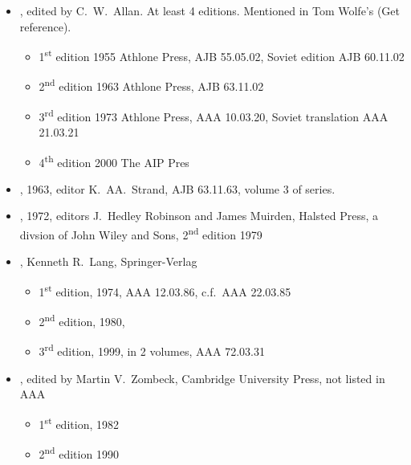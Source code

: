 \documentclass{article}
\begin{document}
\begin{itemize}
  
\item {}, edited by C.\ W.\ Allan. At least
  4 editions. Mentioned in Tom Wolfe's  (Get
  reference).
  \begin{itemize}
  \item 1\textsuperscript{st} edition 1955 Athlone Press, AJB
    55.05.02, Soviet edition AJB 60.11.02
  \item 2\textsuperscript{nd} edition 1963 Athlone Press, AJB 63.11.02
  \item 3\textsuperscript{rd} edition 1973 Athlone Press, AAA 10.03.20,
    Soviet translation AAA 21.03.21
  \item 4\textsuperscript{th} edition 2000 The AIP Pres
  \end{itemize}

\item {}, 1963, editor K.\ AA.\ Strand, AJB
  63.11.63, volume 3 of  series.

\item {}, 1972, editors J.\ Hedley Robinson and
  James Muirden, Halsted Press, a divsion of John Wiley and Sons,
  2\textsuperscript{nd} edition 1979

\item {}, Kenneth R.\ Lang, Springer-Verlag
  \begin{itemize}
  \item 1\textsuperscript{st} edition, 1974, AAA 12.03.86, c.f.\ AAA 22.03.85
  \item 2\textsuperscript{nd} edition, 1980,
  \item 3\textsuperscript{rd} edition, 1999, in 2 volumes, AAA 72.03.31
  \end{itemize}
  
\item {}, edited by
  Martin V.\ Zombeck, Cambridge University Press, not listed in AAA
  \begin{itemize}
  \item 1\textsuperscript{st} edition, 1982
  \item 2\textsuperscript{nd} edition 1990
  \end{itemize}
  
\end{itemize}
\end{document}
